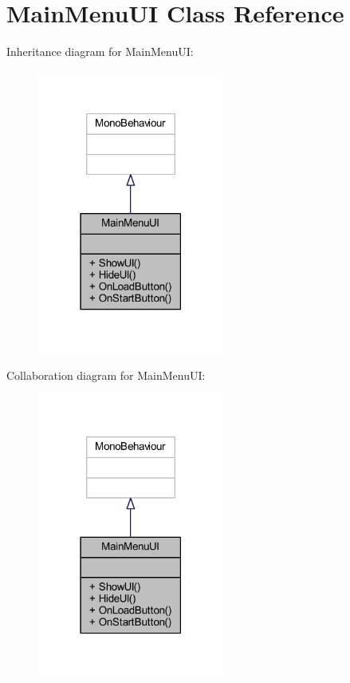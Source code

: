 \hypertarget{class_main_menu_u_i}{}\section{Main\+Menu\+UI Class Reference}
\label{class_main_menu_u_i}


Inheritance diagram for Main\+Menu\+UI\+:\nopagebreak
\begin{figure}[H]
\begin{center}
\leavevmode
\includegraphics[width=174pt]{class_main_menu_u_i__inherit__graph}
\end{center}
\end{figure}


Collaboration diagram for Main\+Menu\+UI\+:\nopagebreak
\begin{figure}[H]
\begin{center}
\leavevmode
\includegraphics[width=174pt]{class_main_menu_u_i__coll__graph}
\end{center}
\end{figure}
